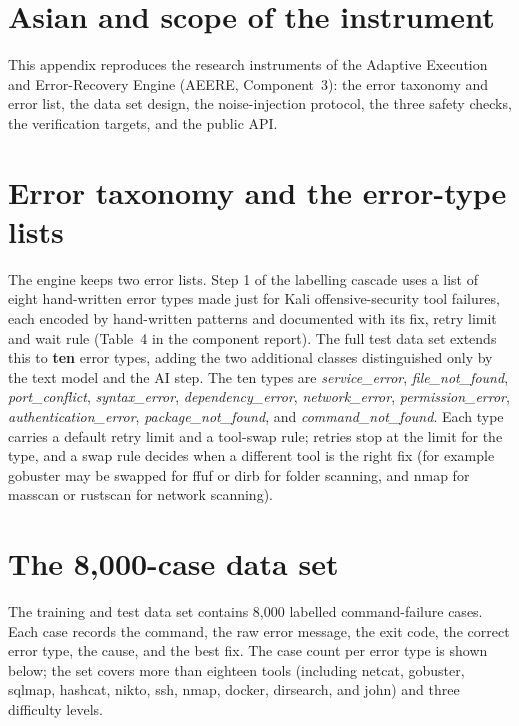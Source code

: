 \section{Asian and scope of the instrument}

This appendix reproduces the research instruments of the Adaptive Execution and
Error-Recovery Engine (AEERE, Component~3): the error taxonomy and error list,
the data set design, the noise-injection protocol, the three safety checks, the
verification targets, and the public API.

\section{Error taxonomy and the error-type lists}

The engine keeps two error lists. Step 1 of the labelling cascade uses a list of
eight hand-written error types made just for Kali offensive-security tool
failures, each encoded by hand-written patterns and documented with its fix,
retry limit and wait rule (Table~4 in the component report). The full test data
set extends this to \textbf{ten} error types, adding the two additional classes
distinguished only by the text model and the AI step. The ten types are
\emph{service\_error}, \emph{file\_not\_found}, \emph{port\_conflict},
\emph{syntax\_error}, \emph{dependency\_error}, \emph{network\_error},
\emph{permission\_error}, \emph{authentication\_error}, \emph{package\_not\_found},
and \emph{command\_not\_found}. Each type carries a default retry limit and a
tool-swap rule; retries stop at the limit for the type, and a swap rule decides
when a different tool is the right fix (for example gobuster may be swapped for
ffuf or dirb for folder scanning, and nmap for masscan or rustscan for network
scanning).

\section{The 8,000-case data set}

The training and test data set contains 8,000 labelled command-failure cases.
Each case records the command, the raw error message, the exit code, the correct
error type, the cause, and the best fix. The case count per error type is shown
below; the set covers more than eighteen tools (including netcat, gobuster,
sqlmap, hashcat, nikto, ssh, nmap, docker, dirsearch, and john) and three
difficulty levels.

